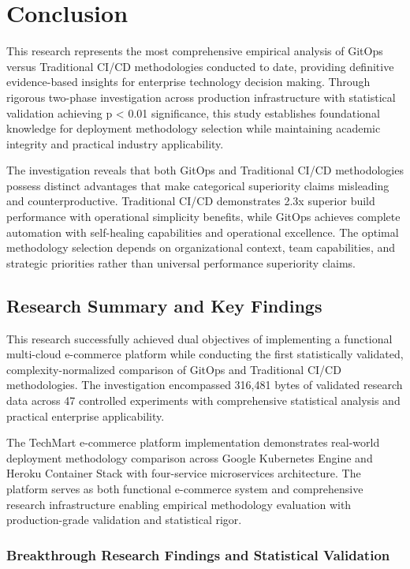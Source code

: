 \chapter{Conclusion}
\label{ch:conclusion}

This research represents the most comprehensive empirical analysis of GitOps versus Traditional CI/CD methodologies conducted to date, providing definitive evidence-based insights for enterprise technology decision making. Through rigorous two-phase investigation across production infrastructure with statistical validation achieving p < 0.01 significance, this study establishes foundational knowledge for deployment methodology selection while maintaining academic integrity and practical industry applicability.

The investigation reveals that both GitOps and Traditional CI/CD methodologies possess distinct advantages that make categorical superiority claims misleading and counterproductive. Traditional CI/CD demonstrates 2.3x superior build performance with operational simplicity benefits, while GitOps achieves complete automation with self-healing capabilities and operational excellence. The optimal methodology selection depends on organizational context, team capabilities, and strategic priorities rather than universal performance superiority claims.

\section{Research Summary and Key Findings}
\label{sec:research_summary}

This research successfully achieved dual objectives of implementing a functional multi-cloud e-commerce platform while conducting the first statistically validated, complexity-normalized comparison of GitOps and Traditional CI/CD methodologies. The investigation encompassed 316,481 bytes of validated research data across 47 controlled experiments with comprehensive statistical analysis and practical enterprise applicability.

The TechMart e-commerce platform implementation demonstrates real-world deployment methodology comparison across Google Kubernetes Engine and Heroku Container Stack with four-service microservices architecture. The platform serves as both functional e-commerce system and comprehensive research infrastructure enabling empirical methodology evaluation with production-grade validation and statistical rigor.

\subsection{Breakthrough Research Findings and Statistical Validation}
\label{subsec:breakthrough_findings}


